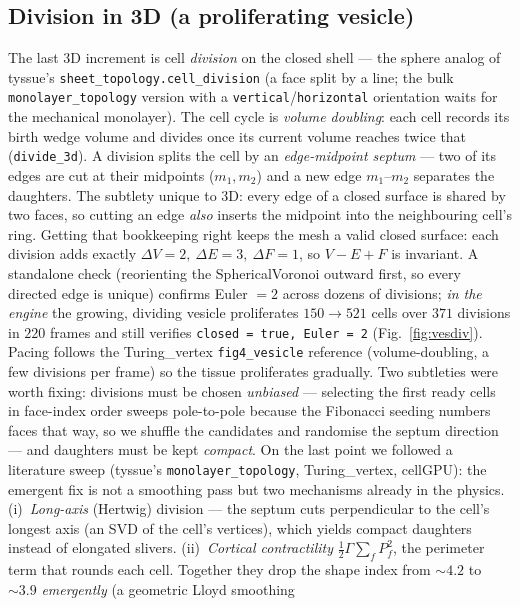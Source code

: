 \documentclass[11pt]{article}
\begin{document}
\subsection*{Division in 3D (a proliferating vesicle)}
The last 3D increment is cell \emph{division} on the closed shell --- the sphere analog of tyssue's
\texttt{sheet\_topology.cell\_division} (a face split by a line; the bulk \texttt{monolayer\_topology}
version with a \texttt{vertical}/\texttt{horizontal} orientation waits for the mechanical monolayer).
The cell cycle is \emph{volume doubling}: each cell records its birth wedge volume and divides once its
current volume reaches twice that (\texttt{divide\_3d}). A division splits the cell by an
\emph{edge-midpoint septum} --- two of its edges are cut at their midpoints ($m_1,m_2$) and a new edge
$m_1$--$m_2$ separates the daughters. The subtlety unique to 3D: every edge of a closed surface is
shared by two faces, so cutting an edge \emph{also} inserts the midpoint into the neighbouring cell's
ring. Getting that bookkeeping right keeps the mesh a valid closed surface: each division adds exactly
$\Delta V\!=\!2,\ \Delta E\!=\!3,\ \Delta F\!=\!1$, so $V\!-\!E\!+\!F$ is invariant. A standalone check
(reorienting the SphericalVoronoi outward first, so every directed edge is unique) confirms
Euler $=2$ across dozens of divisions; \emph{in the engine} the growing, dividing vesicle proliferates
$150\!\to\!521$ cells over $371$ divisions in $220$ frames and still verifies \texttt{closed = true,
Euler = 2} (Fig.~\ref{fig:vesdiv}). Pacing follows the Turing\_vertex \texttt{fig4\_vesicle} reference
(volume-doubling, a few divisions per frame) so the tissue proliferates gradually. Two subtleties were
worth fixing: divisions must be chosen \emph{unbiased} --- selecting the first ready cells in face-index
order sweeps pole-to-pole because the Fibonacci seeding numbers faces that way, so we shuffle the
candidates and randomise the septum direction --- and daughters must be kept \emph{compact}. On the
last point we followed a literature sweep (tyssue's \texttt{monolayer\_topology}, Turing\_vertex, cellGPU):
the emergent fix is not a smoothing pass but two mechanisms already in the physics. (i)~\emph{Long-axis}
(Hertwig) division --- the septum cuts perpendicular to the cell's longest axis (an SVD of the cell's
vertices), which yields compact daughters instead of elongated slivers. (ii)~\emph{Cortical
contractility} $\tfrac12\Gamma\sum_f P_f^2$, the perimeter term that rounds each cell. Together they
drop the shape index from $\sim\!4.2$ to $\sim\!3.9$ \emph{emergently} (a geometric Lloyd smoothing
\end{document}
